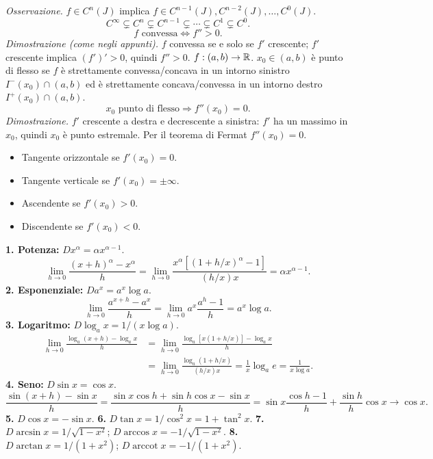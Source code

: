 \textit{Osservazione.} $f\in C^n(J)$ implica $f\in C^{n-1}(J),C^{n-2}(J),\ldots,C^0(J)$.
\[C^\infty\subsetneq C^n\subsetneq C^{n-1}\subsetneq\cdots\subsetneq C^1\subsetneq C^0.\]
\[f\text{ convessa}\iff f''>0.\]
\textit{Dimostrazione (come negli appunti).} $f$ convessa se e solo se $f'$ crescente; $f'$ crescente implica $(f')'>0$, quindi $f''>0$.
$f:(a,b)\to\mathbb R$. $x_0\in(a,b)$ è punto di flesso se $f$ è strettamente convessa/concava in un intorno sinistro $I^-(x_0)\cap(a,b)$ ed è strettamente concava/convessa in un intorno destro $I^+(x_0)\cap(a,b)$.
\[x_0\text{ punto di flesso}\Longrightarrow f''(x_0)=0.\]
\textit{Dimostrazione.} $f'$ crescente a destra e decrescente a sinistra: $f'$ ha un massimo in $x_0$, quindi $x_0$ è punto estremale. Per il teorema di Fermat $f''(x_0)=0$.
\begin{itemize}\item Tangente orizzontale se $f'(x_0)=0$.\item Tangente verticale se $f'(x_0)=\pm\infty$.\item Ascendente se $f'(x_0)>0$.\item Discendente se $f'(x_0)<0$.\end{itemize}
\textbf{1. Potenza:} $D x^\alpha=\alpha x^{\alpha-1}$.
\[\lim_{h\to0}\frac{(x+h)^\alpha-x^\alpha}{h}=\lim_{h\to0}\frac{x^\alpha[(1+h/x)^\alpha-1]}{(h/x)x}=\alpha x^{\alpha-1}.\]
\textbf{2. Esponenziale:} $D a^x=a^x\log a$.
\[\lim_{h\to0}\frac{a^{x+h}-a^x}{h}=\lim_{h\to0}a^x\frac{a^h-1}{h}=a^x\log a.\]
\textbf{3. Logaritmo:} $D\log_a x=1/(x\log a)$.
\begin{align*}\lim_{h\to0}\frac{\log_a(x+h)-\log_a x}{h}&=\lim_{h\to0}\frac{\log_a[x(1+h/x)]-\log_a x}{h}\\&=\lim_{h\to0}\frac{\log_a(1+h/x)}{(h/x)x}=\frac1x\log_a e=\frac1{x\log a}.\end{align*}
\textbf{4. Seno:} $D\sin x=\cos x$.
\[\frac{\sin(x+h)-\sin x}{h}=\frac{\sin x\cos h+\sin h\cos x-\sin x}{h}=\sin x\frac{\cos h-1}{h}+\frac{\sin h}{h}\cos x\longrightarrow\cos x.\]
\textbf{5.} $D\cos x=-\sin x$.\quad
\textbf{6.} $D\tan x=1/\cos^2x=1+\tan^2x$.
\textbf{7.} $D\arcsin x=1/\sqrt{1-x^2}$; $D\arccos x=-1/\sqrt{1-x^2}$.
\textbf{8.} $D\arctan x=1/(1+x^2)$; $D\operatorname{arccot}x=-1/(1+x^2)$.
